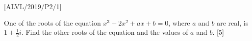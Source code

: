 \item {[}ALVL/2019/P2/1{]} 

One of the roots of the equation $x^{3}+2x^{2}+ax+b=0$, where $a$
and $b$ are real, is $1+\frac{1}{2}i$. Find the other roots of the
equation and the values of $a$ and $b$. \hfill{}{[}5{]}

